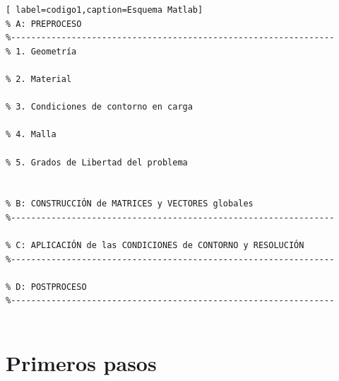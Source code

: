 \begin{lstlisting}[ label=codigo1,caption=Esquema Matlab]
% A: PREPROCESO
%----------------------------------------------------------------
% 1. Geometría

% 2. Material

% 3. Condiciones de contorno en carga

% 4. Malla

% 5. Grados de Libertad del problema


% B: CONSTRUCCIÓN de MATRICES y VECTORES globales
%----------------------------------------------------------------

% C: APLICACIÓN de las CONDICIONES de CONTORNO y RESOLUCIÓN
%----------------------------------------------------------------

% D: POSTPROCESO
%----------------------------------------------------------------


\end{lstlisting}


\clearpage
\section{Primeros pasos}
\label{sec:1pasos}

